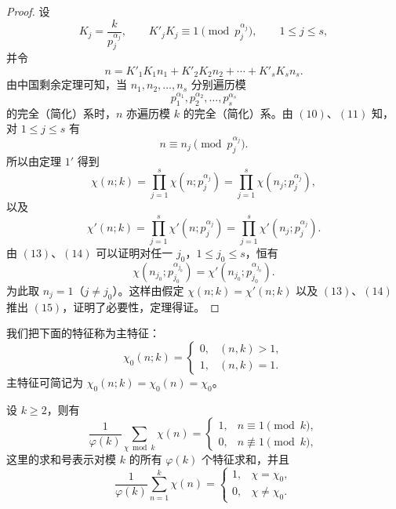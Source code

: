 \begin{proof}
	设
	\begin{equation}
		K_j=\frac{k}{p_j^{\alpha_j}},\qquad
		K'_jK_j\equiv1\pmod {p_j^{\alpha_j}},
		\qquad 1\leq j\leq s,
	\tag{10}
	\end{equation}
	并令
	\begin{equation}
		n=K'_1K_1n_1+K'_2K_2n_2+\cdots+K'_sK_sn_s.
	\tag{11}
	\end{equation}
	由中国剩余定理可知，当 $n_1,n_2,\ldots,n_s$ 分别遍历模
	\[
		p_1^{\alpha_1},p_2^{\alpha_2},\ldots,p_s^{\alpha_s}
	\]
	的完全（简化）系时，$n$ 亦遍历模 $k$ 的完全（简化）系。由 \((10)\)、\((11)\) 知，对 $1\leq j\leq s$ 有
	\begin{equation}
		n\equiv n_j\pmod {p_j^{\alpha_j}}.
		\tag{12}
	\end{equation}
	所以由定理 \(1'\) 得到
	\begin{equation}
		\chi(n;k)=\prod_{j=1}^{s}\chi(n;p_j^{\alpha_j})
		=
		\prod_{j=1}^{s}\chi(n_j;p_j^{\alpha_j}),
		\tag{13}
	\end{equation}
	以及
	\begin{equation}
		\chi'(n;k)=\prod_{j=1}^{s}\chi'(n;p_j^{\alpha_j})
		=
		\prod_{j=1}^{s}\chi'(n_j;p_j^{\alpha_j}).
		\tag{14}
	\end{equation}
	由 \((13)\)、\((14)\) 可以证明对任一 $j_0$，$1\leq j_0\leq s$，恒有
	\begin{equation}
		\chi(n_{j_0};p_{j_0}^{\alpha_{j_0}})
		=
		\chi'(n_{j_0};p_{j_0}^{\alpha_{j_0}}).
		\tag{15}
	\end{equation}
	为此取 $n_j=1$（$j\neq j_0$）。这样由假定 $\chi(n;k)=\chi'(n;k)$ 以及 \((13)\)、\((14)\) 推出 \((15)\)，证明了必要性，定理得证。
\end{proof}

我们把下面的特征称为主特征：
\begin{equation}
	\chi_0(n;k)=
	\begin{cases}
		0, & (n,k)>1,\\
		1, & (n,k)=1.
	\end{cases}
	\tag{16}
\end{equation}
主特征可简记为 $\chi_0(n;k)=\chi_0(n)=\chi_0$。

\begin{theorem}[原文 定理 9，正交性]
	设 $k\geq2$，则有
	\begin{equation}
		\frac{1}{\varphi(k)}
		\sum_{\chi\bmod k}\chi(n)
		=
		\begin{cases}
			1, & n\equiv1\pmod k,\\
			0, & n\not\equiv1\pmod k,
		\end{cases}
		\tag{17}
	\end{equation}
	这里的求和号表示对模 $k$ 的所有 $\varphi(k)$ 个特征求和，并且
	\begin{equation}
		\frac{1}{\varphi(k)}
		\sum_{n=1}^{k}\chi(n)
		=
		\begin{cases}
			1, & \chi=\chi_0,\\
			0, & \chi\neq\chi_0.
		\end{cases}
		\tag{18}
	\end{equation}
\end{theorem}

